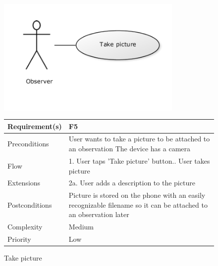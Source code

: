 \begin{figure}[!htb]
		\centering
		\includegraphics[width=0.8\textwidth]{reqspec/uc/takepicture.png}
		\caption{Take picture}
		\label{fig:takepicture}

\begin{tabular}[t]{|l|p{}|}\hline
	Requirement(s)&F5\\\hline
	Preconditions&User wants to take a picture to be attached to an observation\newline
	The device has a camera\\\hline
	Flow&1. User taps 'Take picture' button.\newline
	2. User takes picture \\\hline
	Extensions& 2a. User adds a description to the picture\\\hline
	Postconditions&Picture is stored on the phone with an easily recognizable filename so it can be attached to an observation 	later\\\hline
	Complexity&Medium\\\hline
	Priority&Low\\\hline
\end{tabular}
\end{figure}


\clearpage



